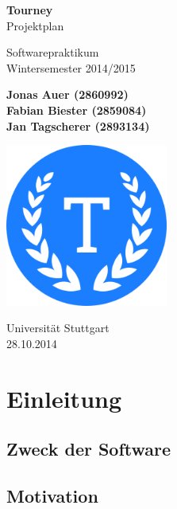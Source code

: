 \documentclass[11pt]{article}
\begin{document}
\begin{titlepage}
	\begin{center}
		\vspace*{1cm}

		\Huge
		\textbf{Tourney}\\
		Projektplan

		\vspace{0.5cm}
		\LARGE
		Softwarepraktikum\\
		\Large
		Wintersemester 2014/2015

		\vspace{1.5cm}

		\large
		\textbf{Jonas Auer (2860992)\\
				 Fabian Biester (2859084)\\
				 Jan Tagscherer (2893134)}

		\vfill

		\includegraphics[width=0.4\textwidth]{Logo.png}

		\vspace{1.5cm}

		\Large
		Universität Stuttgart\\
		28.10.2014
	\end{center}
\end{titlepage}

\newpage

\tableofcontents
\newpage

\section{Einleitung}

\subsection{Zweck der Software}

\subsection{Motivation}
\end{document}
